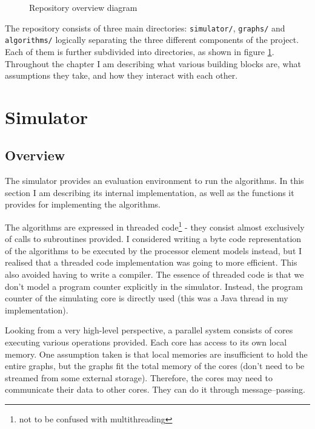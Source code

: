 \documentclass[12pt,a4paper,oneside,openright]{report}
\begin{document}
\begin{figure}[t]
\caption{Repository overview diagram}
\label{repo}
\end{figure}


The repository consists of three main directories: \texttt{simulator/}, \texttt{graphs/} and \texttt{algorithms/} logically separating the three different components of the project. Each of them is further subdivided into directories, as shown in figure \ref{repo}.
Throughout the chapter I am describing what various building blocks are, what assumptions they take, and how they interact with each other.

\section{Simulator}
\subsection{Overview}
The simulator provides an evaluation environment to run the algorithms. In this section I am describing its internal implementation, as well as the functions it provides for implementing the algorithms. 

The algorithms are expressed in threaded code\footnote{not to be confused with multithreading} - they consist almost exclusively of calls to subroutines provided. I considered writing a byte code representation of the algorithms to be executed by the processor element models instead, but I realised that a threaded code implementation was going to more efficient. This also avoided having to write a compiler. The essence of threaded code is that we don't model a program counter explicitly in the simulator. Instead, the program counter of the simulating core is directly used (this was a Java thread in my implementation). 

Looking from a very high-level perspective, a parallel system consists of cores executing various operations provided. Each core has access to its own local memory. One assumption taken is that local memories are insufficient to hold the entire graphs, but the graphs fit the total memory of the cores (don't need to be streamed from some external storage). Therefore, the cores may need to communicate their data to other cores. They can do it through message--passing.
\end{document}

